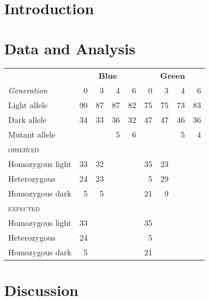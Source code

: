 \documentclass{article}
\title{}
\author{Arman Bilge}
\begin{document}
    \maketitle

    \section*{Introduction}

    \section*{Data and Analysis}

    \begin{table}
        \begin{tabular}{l r r r r r r r r}
            \toprule
            & \multicolumn{4}{c}{\textbf{Blue}}
                & \multicolumn{4}{c}{\textbf{Green}} \\
            \emph{Generation} & 0 & 3 & 4 & 6 & 0 & 3 & 4 & 6 \\
            \midrule
            Light allele & 90 & 87 & 87 & 82 & 75 & 75 & 73 & 83 \\
            Dark allele & 34 & 33 & 36 & 32 & 47 & 47 & 46 & 36 \\
            Mutant allele & & & 5 & 6 & & & 5 & 4 \\
            \midrule
            \textsc{observed} \\
            Homozygous light & 33 & 32 & & & 35 & 23 \\
            Heterozygous & 24 & 23 & & & 5 & 29 \\
            Homozygous dark & 5 & 5 & & & 21 & 9 \\
            \midrule
            \textsc{expected} \\
            Homozygous light & 33 & & & & 35 & \\
            Heterozygous & 24 & & & & 5 & \\
            Homozygous dark & 5 & & & & 21 & \\
            \bottomrule
        \end{tabular}
    \end{table}

    \section*{Discussion}
\end{document}
